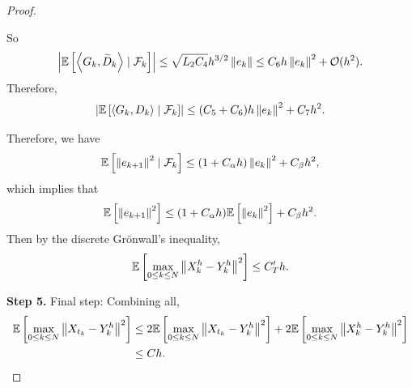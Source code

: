 \begin{proof}
\begin{itemize}
\begin{equation*}
        \end{equation*}
        So
        \begin{equation*}
            \left|\mathbb{E}\left[\left\langle G_k, \widetilde{D}_k\right\rangle \mid \mathcal{F}_k\right]\right| \leq \sqrt{L_2C_4} h^{3/2}\left\lVert e_k\right\lVert \leq C_6h \left\lVert e_k\right\lVert^2 + \mathcal{O}(h^2).
        \end{equation*}
        Therefore,
        \begin{equation*}
            \left\lvert\mathbb{E}\left[\left\langle G_k, D_k\right\rangle \mid \mathcal{F}_k\right]\right\lvert \leq (C_5+C_6)h \left\lVert e_k\right\lVert^2 + C_7h^2.
        \end{equation*}
    \end{itemize}
    Therefore, we have
    \begin{equation*}
        \mathbb{E}\left[\left\lVert e_{k+1}\right\lVert^2 \mid \mathcal{F}_k\right] \leq (1 + C_\alpha h)\left\lVert e_k\right\lVert^2 + C_\beta h^2,
    \end{equation*}
    which implies that
    \begin{equation*}
        \mathbb{E}\left[\left\lVert e_{k+1}\right\lVert^2\right] \leq (1 + C_\alpha h)\mathbb{E}\left[\left\lVert e_k\right\lVert^2\right] + C_\beta h^2.
    \end{equation*}
    Then by the discrete Gr\"onwall's inequality,
    \begin{equation*}
        \mathbb{E}\left[\max_{0\leq k \leq N} \left\lVert X_k^h-Y_k^h\right\lVert^2\right] \leq C_T^\prime h.
    \end{equation*}    

    \vspace{0.5em}
    \textbf{Step 5.} Final step: Combining all, 
    \begin{align*}
        \mathbb{E}\left[\max_{0\leq k \leq N} \left\lVert X_{t_k}-Y_k^h\right\lVert^2\right] &\leq 2\mathbb{E}\left[\max_{0\leq k \leq N} \left\lVert X_{t_k}-Y_k^h\right\lVert^2\right] + 2\mathbb{E}\left[\max_{0\leq k \leq N} \left\lVert X_k^h-Y_k^h\right\lVert^2\right] \\
        &\leq Ch. \qedhere
    \end{align*}
\end{proof}

